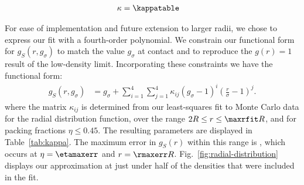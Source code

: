 \documentclass[letterpaper,twocolumn,amsmath,amssymb,pre,aps,10pt]{revtex4-1}
\newcommand{\cyan}[1]{{\bf \color{cyan} #1}}
\newcommand{\jeffsays}[1]{{\color{red} [\cyan{Jeff:} \emph{#1}]}}
\begin{document}
\begin{table}
  \begin{align*}
    \kappa &= \kappatable
  \end{align*}
  \caption{The fitted $\kappa_{ij}$ matrix.
  }\label{tab:kappa}
\end{table}

For ease of implementation and future extension to larger radii, we
chose to express our fit with a fourth-order polynomial.  We constrain
our functional form for $g_S(r, g_\sigma)$ to match the value
$g_\sigma$ at contact and to reproduce the $g(r)=1$ result of the
low-density limit.  Incorporating these constraints we have the
functional form:
\begin{align}
  g_S(r,g_\sigma) &=
  g_\sigma + \sum_{i=1}^{4} \sum_{j=1}^{4} \kappa_{ij} (g_\sigma - 1)^i
  \left(\tfrac{r}{\sigma}-1\right)^j.
  \label{eq:fit-form}
\end{align}
where the matrix $\kappa_{ij}$ is determined from our least-squares
fit to Monte Carlo data for the radial distribution function, over the
range $2R \le r \le \maxrfit R$, and for packing fractions $\eta \le
0.45$.  The resulting parameters are displayed in
Table~\ref{tab:kappa}.  The maximum error in $g_S(r)$ within this
range is \maxerr, which occurs at $\eta = \etamaxerr$ and $r =
\rmaxerr R$.  Fig.~\ref{fig:radial-distribution} displays
our approximation at just under half of the densities that were
included in the fit.

\newcommand{\plotcomp}[1]{\jeffsays{there's no green dash label in the
    legend above.  Do we want the green dashes?}The top halves of
  these figures show the results of Monte Carlo simulations, while the
  bottom halves show the CVA.  On the right are plots of #1 on the
  paths illustrated in the figures to the left.  These plots compare
  the CVA (blue solid line), Monte Carlo results (black circles), the
  results of Sokolowski and Fischer (red dashed
  line)~\cite{sokolowski1992role}, and those of Fischer and Methfessel
  (green dot-dashed line)~\cite{fischer1980born}.  The latter is only
  plotted at contact, where it is defined}
\end{document}
